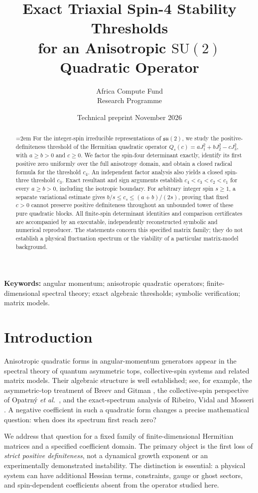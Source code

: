 \documentclass[11pt,a4paper]{article}
\title{\bfseries Exact Triaxial Spin-4 Stability Thresholds\\[3pt]
for an Anisotropic $\mathrm{SU}(2)$ Quadratic Operator}
\author{Africa Compute Fund\\\small Research Programme}
\date{Technical preprint \quad\textbullet\quad 3 November 2026}
\begin{document}
\maketitle
\begin{abstract}
\emergencystretch=2em
For the integer-spin irreducible representations of $\mathfrak{su}(2)$, we study the
positive-definiteness threshold of the Hermitian quadratic operator
$Q_s(c)=aJ_1^2+bJ_2^2-cJ_3^2$, with $a\geq b>0$ and $c\geq0$.
We factor the spin-four determinant exactly, identify its first positive zero
uniformly over the full anisotropy domain, and obtain a closed radical formula
for the threshold $c_4$. An independent factor analysis also yields a closed
spin-three threshold $c_3$. Exact resultant and sign arguments establish
$c_4<c_3<c_2<c_1$ for every $a\geq b>0$, including the isotropic boundary.
For arbitrary integer spin $s\geq1$, a separate variational estimate gives
$b/s\leq c_s\leq(a+b)/(2s)$, proving that fixed $c>0$ cannot preserve
positive definiteness throughout an unbounded tower of these pure quadratic
blocks. All finite-spin determinant identities and comparison certificates
are accompanied by an executable, independently reconstructed symbolic and
numerical reproducer. The statements concern this specified matrix family;
they do not establish a physical fluctuation spectrum or the viability of a
particular matrix-model background.
\end{abstract}

\textbf{Keywords:} angular momentum; anisotropic quadratic operators;
finite-dimensional spectral theory; exact algebraic thresholds; symbolic
verification; matrix models.

\section{Introduction}
Anisotropic quadratic forms in angular-momentum generators appear in the
spectral theory of quantum asymmetric tops, collective-spin systems and
related matrix models. Their algebraic structure is well established; see,
for example, the asymmetric-top treatment of Breev and Gitman
\cite{breev2023}, the collective-spin perspective of Opatrn\'{y}
\emph{et al.}\ \cite{opatrny2018}, and the exact-spectrum analysis of
Ribeiro, Vidal and Mosseri \cite{ribeiro2008}. A negative coefficient
in such a quadratic form changes a precise mathematical question: when
does its spectrum first reach zero?

We address that question for a fixed family of finite-dimensional
Hermitian matrices and a specified coefficient domain. The primary
object is the first loss of \emph{strict positive definiteness}, not a
dynamical growth exponent or an experimentally demonstrated
instability. The distinction is essential: a physical system can have
additional Hessian terms, constraints, gauge or ghost sectors, and
spin-dependent coefficients absent from the operator studied here.
\end{document}
